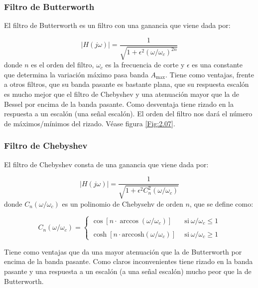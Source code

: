 \documentclass[12pt,a4paper]{article}
\numberwithin{equation}{section}
\numberwithin{figure}{section}
\newcommand{\arccosh}{\mathrm{arccosh}}
\begin{document}
\subsubsection{Filtro de Butterworth}

El filtro de Butterworth es un filtro con una ganancia que viene dada por:

\begin{equation}
|H(j \omega )| = \dfrac{1}{\sqrt{1+\epsilon^2 (\omega /  \omega_c)^{2n}}}
\end{equation}
donde $n$ es el orden del filtro, $\omega_c$ es la frecuencia de corte y $\epsilon$ es una constante que determina la variación máximo pasa banda $A_{\max}$.  Tiene como ventajas, frente a otros filtros, que su banda pasante es bastante plana, que su respuesta escalón es mucho mejor que el filtro de Chebyshev y una atenuación mayor que la de Bessel por encima de la banda pasante. Como desventaja tiene rizado en la respuesta a un escalón (una señal escalón). El orden del filtro nos dará el número de máximos/mínimos del rizado. Véase figura \ref{Fig:2.07}.

\subsubsection{Filtro de Chebyshev}

El filtro de Chebyshev consta de una ganancia que viene dada por:

\begin{equation}
|H(j\omega)| = \dfrac{1}{\sqrt{1+\epsilon^2 C_n^2 (\omega/\omega_c)}}
\end{equation}
donde $C_n(\omega/\omega_c)$ es un polinomio de Chebysehv de orden $n$, que se define como:

\begin{equation}
C_n (\omega/\omega_c) = \left\lbrace \begin{array}{cl}
\cos [n  \cdot \arccos (\omega/\omega_c)] & \ \ \mathrm{si} \ \omega/\omega_c \leq 1 \\ \\
\cosh [n \cdot  \arccosh (\omega/\omega_c)] & \ \ \mathrm{si} \ \omega/\omega_c \geq 1 
\end{array}  \right.
\end{equation}

Tiene como ventajas que da una mayor atenuación que la de Butterworth por encima de la banda pasante. Como claros inconvenientes tiene rizado en la banda pasante y una respuesta a un escalón (a una señal escalón) mucho peor que la de Butterworth. 
\end{document}
